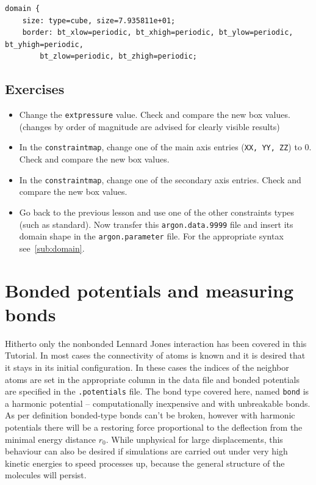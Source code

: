 \begin{lstlisting}
domain {
    size: type=cube, size=7.935811e+01;
    border: bt_xlow=periodic, bt_xhigh=periodic, bt_ylow=periodic, bt_yhigh=periodic,
        bt_zlow=periodic, bt_zhigh=periodic;
\end{lstlisting}


\subsection{Exercises}
\begin{itemize}
 \item Change the \texttt{extpressure} value. Check and compare the new box values. (changes by order of magnitude are advised for clearly visible results)
 \item In the \texttt{constraintmap}, change one of the main axis entries (\texttt{XX, YY, ZZ}) to 0. Check and compare the new box values.
 \item In the \texttt{constraintmap}, change one of the secondary axis entries. Check and compare the new box values.
 \item Go back to the previous lesson and use one of the other constraints types (such as standard). Now transfer this \texttt{argon.data.9999} file and insert
 its domain shape in the \texttt{argon.parameter} file. For the appropriate syntax see~\ref{sub:domain}.
\end{itemize}

\section{Bonded potentials and measuring bonds}
Hitherto only the nonbonded Lennard Jones interaction has been covered in
this Tutorial. In most cases the connectivity of atoms is known and it
is desired that it stays in its initial configuration. In these cases
the indices of the neighbor atoms are set in the appropriate column in
the data file and bonded potentials are specified in the
\texttt{.potentials} file. The bond type covered here, named
\texttt{bond} is a harmonic potential -- computationally inexpensive and
with unbreakable bonds. As
per definition bonded-type bonds can't be broken, however with harmonic
potentials there will be a restoring force proportional to the
deflection from the minimal energy distance $r_0$. While unphysical for
large displacements, this behaviour can also be desired if simulations
are carried out under very high kinetic energies to speed processes up,
because the general structure of the molecules will persist.

